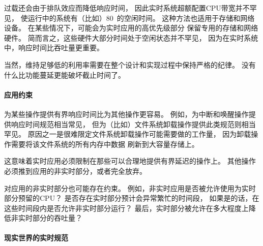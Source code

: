 过载还会由于排队效应而降低响应时间，
因此实时系统超额配置CPU带宽并不罕见，
使运行中的系统有（比如）80\pct\ 的空闲时间。
这种方法也适用于存储和网络设备。
在某些情况下，可能会为实时应用的高优先级部分
保留专用的存储和网络硬件。
简而言之，这些硬件大部分时间处于空闲状态并不罕见，
因为在实时系统中，响应时间比吞吐量更重要。

\QuickQuizEnd

当然，维持足够低的利用率需要在整个设计和实现过程中保持严格的纪律。
没有什么比功能蔓延更能破坏截止时间了。

\paragraph{应用约束}
\label{sec:advsync:Application Constraints}

为某些操作提供有界响应时间比为其他操作更容易。
例如，为中断和唤醒操作提供响应时间规范相当常见，
但为（比如）文件系统卸载操作提供此类规范则相当罕见。
原因之一是很难限定文件系统卸载操作可能需要做的工作量，
因为卸载操作需要将该文件系统的所有内存中数据
刷新到大容量存储上。

这意味着实时应用必须限制在那些可以合理地提供有界延迟的操作上。
其他操作必须推到应用的非实时部分，或者完全放弃。

对应用的非实时部分也可能存在约束。
例如，非实时应用是否被允许使用为实时部分预留的CPU？
是否存在实时部分预计会异常繁忙的时间段，
如果是的话，在这些时间段内是否允许非实时部分运行？
最后，实时部分被允许在多大程度上降低非实时部分的吞吐量？

\paragraph{现实世界的实时规范}
\label{sec:advsync:Real-World Real-Time Specifications}

